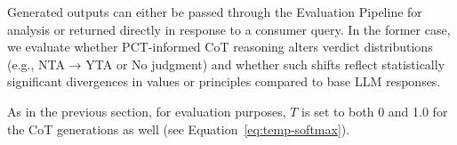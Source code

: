 Generated outputs can either be passed through the Evaluation Pipeline for analysis or returned directly in response to a consumer query. In the former case, we evaluate whether PCT-informed CoT reasoning alters verdict distributions (e.g., NTA → YTA or No judgment) and whether such shifts reflect statistically significant divergences in values or principles compared to base LLM responses.

As in the previous section, for evaluation purposes, $T$ is set to both 0 and 1.0 for the CoT generations as well (see Equation~\ref{eq:temp-softmax}).


